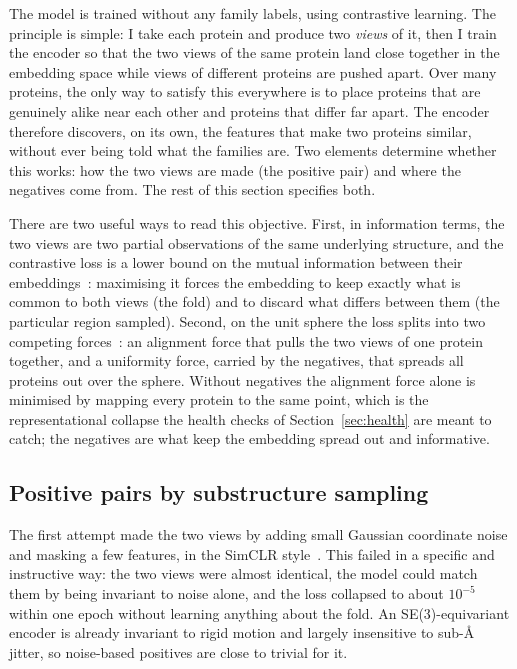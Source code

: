 \documentclass[11pt,a4paper]{article}
\theoremstyle{definition}
\begin{document}
The model is trained without any family labels, using contrastive learning. The
principle is simple: I take each protein and produce two \emph{views} of it, then I
train the encoder so that the two views of the same protein land close together in
the embedding space while views of different proteins are pushed apart. Over many
proteins, the only way to satisfy this everywhere is to place proteins that are
genuinely alike near each other and proteins that differ far apart. The encoder
therefore discovers, on its own, the features that make two proteins similar,
without ever being told what the families are. Two elements determine whether this
works: how the two views are made (the positive pair) and where the negatives come
from. The rest of this section specifies both.

There are two useful ways to read this objective. First, in information terms, the
two views are two partial observations of the same underlying structure, and the
contrastive loss is a lower bound on the mutual information between their
embeddings~\cite{infonce}: maximising it forces the embedding to keep exactly what
is common to both views (the fold) and to discard what differs between them (the
particular region sampled). Second, on the unit sphere the loss splits into
two competing forces~\cite{alignunif}: an alignment force that pulls the two views
of one protein together, and a uniformity force, carried by the negatives, that
spreads all proteins out over the sphere. Without negatives the alignment force
alone is minimised by mapping every protein to the same point, which is the
representational collapse the health checks of Section~\ref{sec:health} are meant
to catch; the negatives are what keep the embedding spread out and informative.

\subsection{Positive pairs by substructure sampling}
\label{sec:substructure}

The first attempt made the two views by adding small Gaussian coordinate noise and
masking a few features, in the SimCLR style~\cite{simclr}. This failed in a
specific and instructive way: the two views were almost identical, the model could
match them by being invariant to noise alone, and the loss collapsed to about
$10^{-5}$ within one epoch without learning anything about the fold. An
SE(3)-equivariant encoder is already invariant to rigid motion and largely
insensitive to sub-\AA{} jitter, so noise-based positives are close to trivial for
it.
\end{document}
